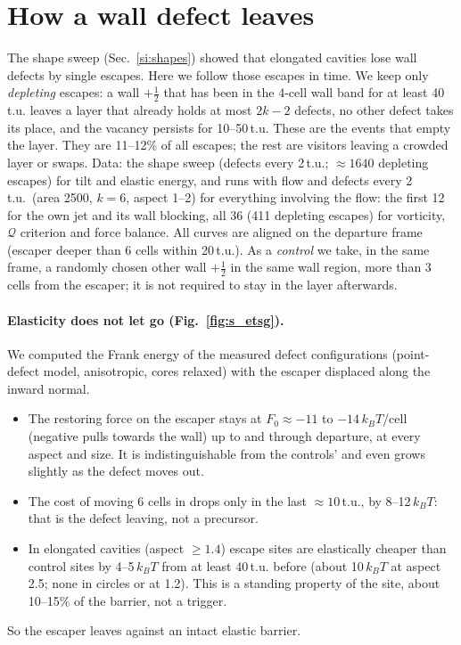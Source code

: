 \documentclass[aps,prl,onecolumn,superscriptaddress,amsmath,amssymb,nofootinbib]{revtex4-2}
\newcommand{\half}{\tfrac12}
\newcommand{\kT}{k_BT}
\begin{document}
\section{How a wall defect leaves}\label{si:escape}
The shape sweep (Sec.~\ref{si:shapes}) showed that elongated cavities lose wall defects by single escapes. Here we follow those escapes in time. We keep only
\emph{depleting} escapes: a wall $+\half$ that has been in the 4-cell wall band for at least 40\,t.u. leaves a layer that already holds at most $2k-2$ defects, no other
defect takes its place, and the vacancy persists for 10--50\,t.u. These are the events that empty the layer. They are 11--12\% of all escapes; the rest are visitors
leaving a crowded layer or swaps. Data: the shape sweep (defects every 2\,t.u.; $\approx1640$ depleting escapes) for tilt and elastic energy, and runs with flow and defects
every 2\,t.u.\ (area 2500, $k=6$, aspect 1--2) for everything involving the flow: the first 12 for the own jet and its wall blocking, all 36 (411 depleting escapes) for vorticity,
$\mathcal Q$ criterion and force balance. All curves are aligned on the departure frame (escaper deeper than 6 cells within 20\,t.u.). As a \emph{control} we take, in the same frame, a randomly chosen other wall $+\half$ in the same wall region, more than 3 cells from the escaper; it is not required to stay in the layer afterwards.

\paragraph{Elasticity does not let go (Fig.~\ref{fig:s_etsg}).} We computed the Frank energy of the measured defect configurations (point-defect model, anisotropic, cores relaxed)
with the escaper displaced along the inward normal.
\begin{itemize}
  \item The restoring force on the escaper stays at $F_0\approx-11$ to $-14\,\kT$/cell (negative pulls towards the wall) up to and through departure, at every aspect and size. It is
        indistinguishable from the controls' and even grows slightly as the defect moves out.
  \item The cost of moving 6 cells in drops only in the last $\approx10$\,t.u., by 8--12\,$\kT$: that is the defect leaving, not a precursor.
  \item In elongated cavities (aspect $\ge1.4$) escape sites are elastically cheaper than control sites by 4--5\,$\kT$ from at least 40\,t.u. before (about 10\,$\kT$ at aspect 2.5; none in circles
        or at 1.2). This is a standing property of the site, about 10--15\% of the barrier, not a trigger.
\end{itemize}
So the escaper leaves against an intact elastic barrier.
\end{document}
